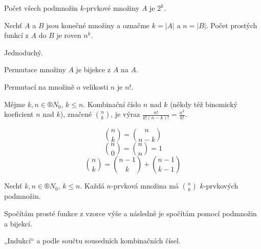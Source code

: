 \documentclass[12pt]{article}					%
\begin{document}
    \begin{dusledek}
        Počet všech podmnožin $k$-prvkové množiny $A$ je $2^{k}$.
    \end{dusledek}

    \begin{tvrzeni}
        Nechť $A$ a $B$ jsou konečné množiny a označme $k = |A|$ a $n = |B|$. Počet prostých funkcí z $A$ do $B$ je roven $n^{\underline{k}}$.

        \begin{dukazin}
            Jednoduchý.
        \end{dukazin}
    \end{tvrzeni}

    \begin{definice}[Permutace]
        Permutace množiny $A$ je bijekce z $A$ na $A$.
    \end{definice}

    \begin{dusledek}
        Permutací na množině o velikosti $n$ je $n!$.
    \end{dusledek}

    \begin{definice}
        Mějme $k, n \in ®N_0$, $k ≤ n$. Kombinační číslo $n$ nad $k$ (někdy též binomický koeficient $n$ nad $k$), značené $\binom{n}{k}$, je výraz $\frac{n!}{k!(n-k)!} = \frac{n^{\underline{k}}}{k!}$.
    \end{definice}

    \begin{poznamka}
        $$ \binom{n}{k} = \binom{n}{n-k} $$ 
        $$ \binom{n}{0} = \binom{n}{n} = 1 $$
        $$ \binom{n}{k} = \binom{n-1}{k} + \binom{n-1}{k-1} $$ 
    \end{poznamka}

    \begin{tvrzeni}
        Nechť $k, n \in ®N_0$, $k ≤ n$. Každá $n$-prvková množina má $\binom{n}{k}$ $k$-prvkových podmnožin.

        \begin{dukazin}
            Spočítám prosté funkce z vzorce výše a následně je spočítám pomocí podmnožin a bijekcí.
        \end{dukazin}

        \begin{dukazin}[Rekurence]
            „Indukcí“ a podle součtu sousedních kombinačních čísel.
        \end{dukazin}
    \end{tvrzeni}
\end{document}
